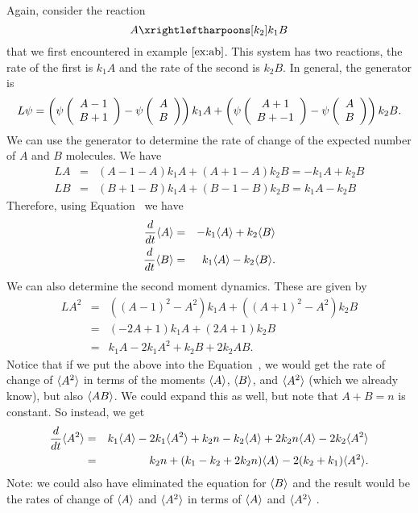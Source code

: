 \begin{example}\label{ex:ab-moment}
Again, consider the reaction
%
$$
A \rreact{k_1}{k_2} B
$$
that we first encountered in example $\ref{ex:ab}$. This system has
two reactions, the rate of the first is $k_1 A$ and the rate of the
second is $k_2 B$. In general, the generator is
%
$$
L \psi = \left ( \psi \left ( \begin{array}{c} A-1 \\ B+1 \end{array} \right ) - \psi \left ( \begin{array}{c} A \\ B \end{array} \right ) \right ) k_1 A
       + \left ( \psi \left ( \begin{array}{c} A+1 \\ B+-1 \end{array} \right ) - \psi \left ( \begin{array}{c} A \\ B \end{array} \right ) \right ) k_2 B .
$$
%
We can use the generator to determine the rate of change of the
expected number of $A$ and $B$ molecules. We have
%
\begin{eqnarray*}
L A & = & ( A - 1 - A ) k_1 A + ( A + 1 - A ) k_2 B = -k_1 A + k_2 B \\
L B & = & ( B + 1 - B ) k_1 A + ( B - 1 - B ) k_2 B = k_1 A - k_2 B
\end{eqnarray*}
%
Therefore, using Equation~ we have
%
\begin{eqnarray*}
\frac{d}{dt} \langle A \rangle & = &  - k_1 \langle A \rangle + k_2 \langle B \rangle \\
\frac{d}{dt} \langle B \rangle & = &  k_1 \langle A \rangle - k_2 \langle B \rangle .
\end{eqnarray*}
%
We can also determine the second moment dynamics. These are given by
%
\begin{eqnarray*}
L A^2 & = & ( ( A-1 )^2 - A^2 ) k_1 A + ( ( A+1 )^2 - A^2 ) k_2 B \\
      & = & ( -2A + 1 ) k_1 A + ( 2A + 1 ) k_2 B \\
      & = & k_1 A - 2 k_1 A^2 + k_2 B + 2 k_2 A B .
\end{eqnarray*}
Notice that if we put the above into the Equation~,
we would get the rate of change of $\langle A^2 \rangle$ in terms of the moments
$\langle A \rangle$, $\langle B \rangle$, and $\langle A^2 \rangle$ (which we already know), but also
$\langle AB \rangle$. We could expand this as well, but note that $A+B=n$ is
constant. So instead, we get
%
\begin{eqnarray*}
\frac{d}{dt} \langle A^2 \rangle & = & k_1 \langle A \rangle - 2 k_1 \langle A^2 \rangle + k_2 n - k_2 \langle A \rangle
        + 2 k_2 n \langle A \rangle - 2 k_2 \langle A^2 \rangle \\
 & = & k_2 n + ( k_1 - k_2 + 2 k_2 n ) \langle A \rangle - 2 ( k_2+k_1 ) \langle A^2 \rangle . 
\end{eqnarray*}
Note: we could also have eliminated the equation for $\langle B \rangle$ and the
result would be the rates of change of $\langle A \rangle$ and $\langle A^2 \rangle$ in terms
of $\langle A \rangle$ and $\langle A^2 \rangle$ .
%
\enx
\end{example}

